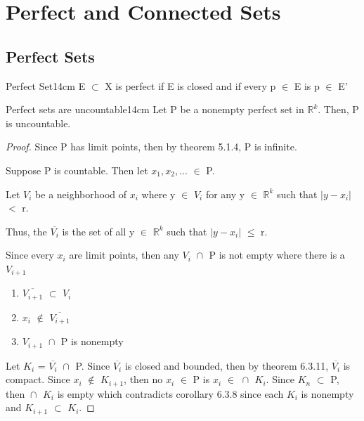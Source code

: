 \newpage

\section[Day 7: Perfect \& Connected Sets]{ Perfect and Connected Sets }

\subsection{ Perfect Sets }

	\begin{definition}{Perfect Set}{14cm}
		E $\subset$ X is perfect if E is closed and if every p $\in$ E
		is p $\in$ E'
	\end{definition}

	\vspace{0.5cm}



	\begin{wtheorem}{Perfect sets are uncountable}{14cm}
		Let P be a nonempty perfect set in $\mathbb{R}^k$.
		Then, P is uncountable.
	\end{wtheorem}

	\begin{proof}
		Since P has limit points, then by {\color{red} theorem 5.1.4},
		P is infinite.

		Suppose P is countable. Then let $x_1, x_2, ...$ $\in$ P.

		Let $V_i$ be a neighborhood of $x_i$ where y $\in$ $V_i$ for any
		y $\in$ $\mathbb{R}^k$ such that $|y-x_i|$ $<$ r.

		Thus, the $\overline{V_i}$ is the set of all y $\in$ $\mathbb{R}^k$
		such that $|y-x_i|$ $\leq$ r.

		Since every $x_i$ are limit points, then any $V_i$ $\cap_{}^{}$ P
		is not empty where there is a $V_{i+1}$

		\begin{enumerate}[label=(\alph*), leftmargin=1cm, itemsep=0.1cm]
			\item $\overline{V_{i+1}}$ $\subset$ $V_i$
			\item $x_i$ $\not \in$ $\overline{V_{i+1}}$
			\item $V_{i+1}$ $\cap_{}^{}$ P is nonempty
		\end{enumerate}

		Let $K_i$ = $\overline{V_i}$ $\cap_{}^{}$ P.
		Since $\overline{V_i}$ is closed and bounded, then by
		{\color{red} theorem 6.3.11}, $\overline{V_i}$ is compact.
		Since $x_i$ $\not \in$ $K_{i+1}$, then no $x_i$ $\in$ P is
		$x_i$ $\in$ $\cap_{}^{}$ $K_i$.
		Since $K_n$ $\subset$ P, then $\cap_{}^{}$ $K_i$ is empty
		which contradicts {\color{orange} corollary 6.3.8 } since
		each $K_i$ is nonempty and $K_{i+1}$ $\subset$ $K_i$.
	\end{proof}




